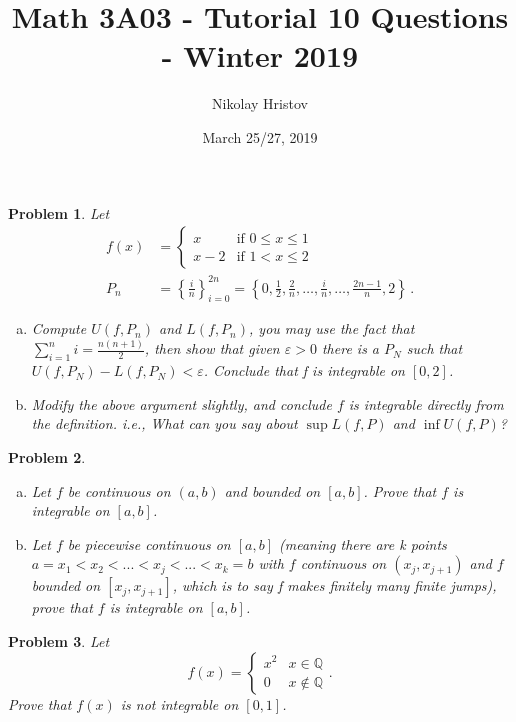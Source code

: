 \documentclass[11pt]{article}
\theoremstyle{plain}
\newtheorem{problem}{Problem}
\theoremstyle{remark}
\newcommand {\mbQ} {\mathbb Q}
\newcommand {\pwi}[4] {\begin{cases} 
		#1 & #2 \\
		#3 & #4
\end{cases}}
\newcommand{\eps}{\varepsilon}
\begin{document}
	\title{Math 3A03 - Tutorial 10 Questions - Winter 2019}
	\author{Nikolay Hristov}
	\date{March 25/27, 2019}
	\maketitle
	
        \begin{problem}Let
          \begin{align*}
            f(x) &= \begin{cases}
              x &\text{if $0\leq x\leq 1$}\\
              x-2 &\text{if $1<x \leq 2$}
            \end{cases}\\
            P_n&=\left\{\frac i n\right\}_{i=0}^{2n}= \left\{0,\frac 1 2, \frac 2 n,
                 \ldots ,\frac i n, \ldots,\frac {2n-1} n, 2\right\} \,.
          \end{align*}
          \begin{enumerate}[(a)]
            
          \item Compute $U(f,P_n)$ and $L(f,P_n)$, you may use the fact that $\sum_{i=1}^n i = \frac{n(n+1)}{2}$, then show that given $\eps>0$ there is a $P_N$ such that $U(f,P_N)-L(f,P_N)<\eps$. Conclude that f is integrable on $[0,2]$.
	
\item Modify the above argument slightly, and conclude $f$ is integrable directly from the definition. i.e., What can you say about $\sup L(f,P)$ and $\inf U(f,P)$?

  \end{enumerate}

\end{problem}

\begin{problem}

\begin{enumerate}[(a)]
		\item Let $f$ be continuous on $(a,b)$ and bounded on $[a,b]$. Prove that $f$ is integrable on $[a,b]$.
		\item Let $f$ be piecewise continuous on $[a,b]$ (meaning there are k points $a=x_1<x_2<...<x_j<...<x_k=b$ with $f$ continuous on $(x_j,x_{j+1})$ and $f$ bounded on $[x_j,x_{j+1}]$, which is to say f makes finitely many finite jumps), prove that $f$ is integrable on $[a,b]$.
	\end{enumerate}
\end{problem}

\begin{problem}
	Let \[f(x) = \pwi{x^2}{x\in \mbQ}{0}{x\notin \mbQ}.\] Prove that $f(x)$ is not integrable on $[0,1]$.
\end{problem}


	
\end{document}
